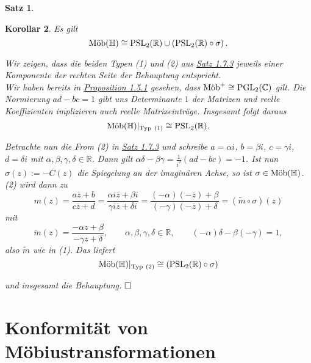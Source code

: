 \documentclass[11pt]{book}
\numberwithin{dummy}{section}
\newtheorem{theorem}{Satz}[section]
\newtheorem{corollary}[theorem]{Korollar}
\theoremstyle{nonumberbreak}
\newenvironment{pr}[1][]{\ifthenelse{\equal{#1}{}}{\proof}{\proof[#1]}\rm}{\endproof}
\newcommand{\C}{\mathbb{C}}
\newcommand{\R}{\mathbb{R}}
\newcommand{\mob}{\textup{Möb}^+}
\newcommand{\amobh}{\textup{Möb}(\mathbb{H})}
\begin{document}
\begin{spacing}{1.4}
\begin{theorem}
\begin{pr}
\end{pr}

\end{theorem}



\hypertarget{korollareinssiebenvier}{}
\begin{corollary}   %
Es gilt
$$\amobh \cong \mathrm{PSL}_2(\R) \cup \left(\mathrm{PSL}_2(\mathbb{R}) \circ \sigma\right).$$

\begin{pr}
Wir zeigen, dass die beiden Typen (1) und (2) aus \hyperlink{satzeinssiebendrei}{Satz 1.7.3} jeweils einer Komponente der rechten Seite der Behauptung entspricht.\\
Wir haben bereits in \hyperlink{propeinsfunfeins}{Proposition 1.5.1} gesehen, dass $\mob \cong \mathrm{PGL}_2(\C)$ gilt. Die Normierung $ad-bc=1$ gibt uns Determinante $1$ der Matrizen und reelle Koeffizienten implizieren auch reelle Matrixeinträge. Insgesamt folgt daraus
$$\amobh \vert_{\mathrm{Typ\ (1)}} \cong \mathrm{PSL}_2(\R).$$

Betrachte nun die From (2) in \hyperlink{satzeinssiebendrei}{Satz 1.7.3} und schreibe $a= \alpha i$, $b= \beta i$, $c= \gamma i$, $d = \delta i$ mit $\alpha, \beta, \gamma, \delta \in \R$. Dann gilt $\alpha \delta - \beta \gamma = \frac{1}{i^2} (ad-bc) = -1$. Ist nun $\sigma (z) := -C(z)$ die Spiegelung an der imaginären Achse, so ist $\sigma \in \amobh$. (2) wird dann zu 
$$m(z) = \frac{a\overline{z} + b}{c\overline{z}+d} = \frac{\alpha i \overline{z} +\beta i}{\gamma i \overline{z} + \delta i} = \frac{(-\alpha)(-\overline{z}) + \beta}{(-\gamma)(-\overline{z}) + \delta} = (\tilde{m} \circ \sigma)(z)$$
mit 
$$\tilde{m}(z) = \frac{-\alpha z + \beta}{-\gamma z + \delta}, \qquad \alpha, \beta, \gamma, \delta \in \R, \qquad (-\alpha) \delta - \beta (-\gamma) = 1,$$
also $\tilde{m}$ wie in (1). Das liefert 
$$\amobh \vert_{\mathrm{Typ\ (2)}} \cong \left(\mathrm{PSL}_2(\R) \circ \sigma \right)$$

und insgesamt die Behauptung. $\hfill \Box$


\end{pr}




\end{corollary}



\newpage

\section{Konformität von Möbiustransformationen} %





\end{spacing}
\end{document}
